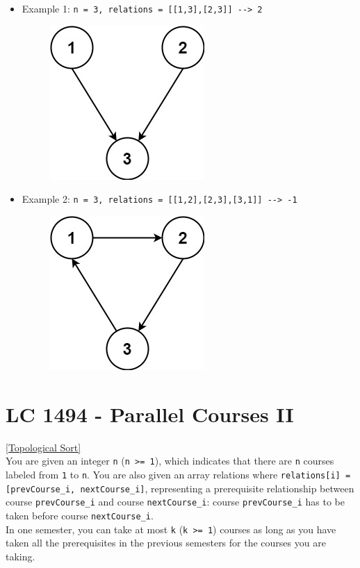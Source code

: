 \begin{itemize}
\item Example 1: {\colorbox{CodeBackground}{\lstinline|n = 3, relations = [[1,3],[2,3]] --> 2|}}
\begin{figure}[H]
\centering
\includegraphics[width=0.15\linewidth]{images/lc1136_eg1}
\label{fig:lc1136eg1}
\end{figure}
\item Example 2: {\colorbox{CodeBackground}{\lstinline|n = 3, relations = [[1,2],[2,3],[3,1]] --> -1|}}
\begin{figure}[H]
\centering
\includegraphics[width=0.15\linewidth]{images/lc1136_eg2}
\label{fig:lc1136eg2}
\end{figure}
\end{itemize}

\section{LC 1494 - Parallel Courses II}\label{lc1494}
{\hyperref[sec:topological_sort]{[Topological Sort]}}\\

You are given an integer {\colorbox{CodeBackground}{\lstinline|n|}} ({\colorbox{CodeBackground}{\lstinline|n >= 1|}}), which indicates that there are {\colorbox{CodeBackground}{\lstinline|n|}} courses labeled from {\colorbox{CodeBackground}{\lstinline|1|}} to {\colorbox{CodeBackground}{\lstinline|n|}}. You are also given an array relations where {\colorbox{CodeBackground}{\lstinline|relations[i] = [prevCourse_i, nextCourse_i]|}}, representing a prerequisite relationship between course {\colorbox{CodeBackground}{\lstinline|prevCourse_i|}} and course {\colorbox{CodeBackground}{\lstinline|nextCourse_i|}}: course {\colorbox{CodeBackground}{\lstinline|prevCourse_i|}} has to be taken before course {\colorbox{CodeBackground}{\lstinline|nextCourse_i|}}.\\

In one semester, you can take at most {\colorbox{CodeBackground}{\lstinline|k|}} ({\colorbox{CodeBackground}{\lstinline|k >= 1|}}) courses as long as you have taken all the prerequisites in the previous semesters for the courses you are taking.\\

